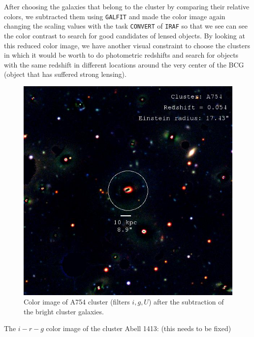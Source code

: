 After choosing the galaxies that belong to the cluster by comparing their relative colors, we subtracted them using \texttt{GALFIT} and made the color image again changing the scaling values with the task \texttt{CONVERT} of \texttt{IRAF} so that we see can see the color contrast to search for good candidates of lensed objects. By looking at this reduced color image, we have another visual constraint to choose the clusters in which it would be worth to do photometric redshifts and search for objects with the same redshift in different locations around the very center of the BCG (object that has suffered strong lensing). 

\begin{figure}[H]
\centering
\includegraphics[width=12cm]{images/cA754_galfit.jpg}
\caption[Color image of A754 after fitting the bright objects]{Color image of A754 cluster (filters $i,g,U$) after the subtraction of the bright cluster galaxies.}
\end{figure}

The $i-r-g$ color image of the cluster Abell 1413: (this needs to be fixed)

